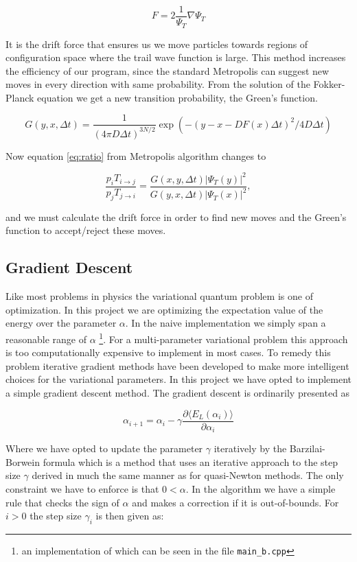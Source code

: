 $$F = 2 \frac{1}{\Psi_T} \nabla \Psi_T$$

It is the drift force that ensures us we move particles towards regions of configuration space where the trail wave function is large. This method increases the efficiency of our program, since the standard Metropolis can suggest new moves in every direction with same probability. 
From the solution of the Fokker-Planck equation we get a new transition probability, the Green's function. 

$$G(y, x, \Delta t) = \frac{1}{(4 \pi D \Delta t)^{3N/2}} \exp (-(y - x - D F(x) \Delta t)^2/4 D \Delta t)$$

Now equation \ref{eq:ratio} from Metropolis algorithm changes to 

$$\frac{p_i T_{i \rightarrow j}}{p_j T_{j \rightarrow i}} = \frac{G(x, y, \Delta t)|\Psi_T(y)|^2}{G(y, x, \Delta t)|\Psi_T(x)|^2},$$

and we must calculate the drift force in order to find new moves and the Green's function to accept/reject these moves.

\subsection{Gradient Descent}

Like most problems in physics the variational quantum problem is one of optimization. In this project we are optimizing the expectation value of the energy over the parameter $\alpha$. In the naive implementation we simply span a reasonable range of $\alpha$ \footnote{an implementation of which can be seen in the file \lstinline{main_b.cpp}}. For a multi-parameter variational problem this approach is too computationally expensive to implement in most cases. To remedy this problem iterative gradient methods have been developed to make more intelligent choices for the variational parameters. In this project we have opted to implement a simple gradient descent method. The gradient descent is ordinarily presented as 

\begin{equation}
\alpha_{i+1} = \alpha_i -\gamma \frac{\partial \langle E_L (\alpha_i) \rangle}{\partial \alpha_i}
\end{equation}

\noindent Where we have opted to update the parameter $\gamma$ iteratively by the Barzilai-Borwein formula which is a method that uses an iterative approach to the step size $\gamma$ derived in much the same manner as for quasi-Newton methods\cite{OptTheory}. The only constraint we have to enforce is that $0 < \alpha$. In the algorithm we have a simple rule  that checks the sign of $\alpha$ and makes a correction if it is out-of-bounds. For $i > 0$ the step size $\gamma_i$ is then given as: 

